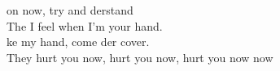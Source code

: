  on now, try and derstand \\
The  I feel when I'm  your hand. \\
ke my hand, come der cover. \\
They  hurt you now,  hurt you now,  hurt you now now  \\

